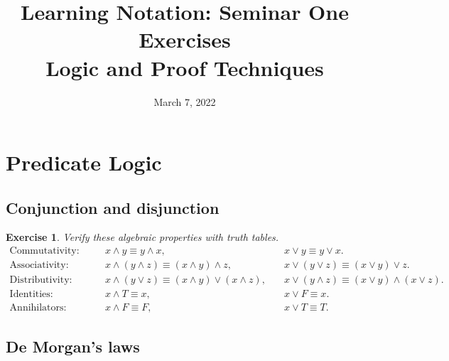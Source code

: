\documentclass{article}[12pt]
\title{
    Learning Notation: Seminar One Exercises \\
    Logic and Proof Techniques
    \vspace{-2em}
    }
\author{}
\date{March 7, 2022}
\newtheorem{exercise}{Exercise}[section]
\begin{document}
    \maketitle
    
    \renewcommand{\labelenumi}{(\alph{enumi})}
    
    
    \setcounter{section}{1}
    \section{Predicate Logic}
            
    \subsection{Conjunction and disjunction}
    
        \begin{exercise}
            Verify these algebraic properties with truth tables.
            \begin{align}
                \text{Commutativity:}\quad&&
                    x \land y
                    \equiv
                    y \land x,
                    \quad&
                    x \lor y
                    \equiv
                    y \lor x.
                \\\text{Associativity:}\quad&&
                    x \land (y \land z)
                    \equiv
                    (x \land y) \land z,
                    \quad&
                    x \lor (y \lor z)
                    \equiv
                    (x \lor y) \lor z.
                \\\text{Distributivity:}\quad&&
                    x \land (y \lor z)
                    \equiv
                    (x \land y) \lor (x \land z),
                    \quad&
                    x \lor (y \land z)
                    \equiv
                    (x \lor y) \land (x \lor z).
                \\\text{Identities:}\quad&&
                    x \land T \equiv x,
                    \quad&
                    x \lor F \equiv x.
                \\\text{Annihilators:}\quad&&
                    x \land F \equiv F,
                    \quad&
                    x \lor T \equiv T.
            \end{align}
        \end{exercise}
        
    \subsection{De Morgan's laws}
    
\end{document}
